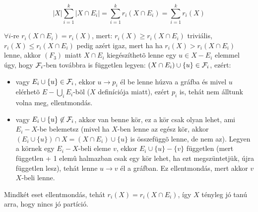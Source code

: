 \[
|X| \sum_{i=1}^k |X \cap E_i| = \sum_{i=1}^k r_i(X \cap E_i) = \sum_{i=1}^k r_i(X)
\]

$\forall i$-re $r_i(X \cap E_i) = r_i(X)$, mert: $r_i(X) \geq r_i(X \cap E_i)$
triviális, $r_i(X) \leq r_i(X \cap E_i)$ pedig azért igaz, mert ha ha $r_i(X)
> r_i(X \cap E_i)$ lenne, akkor $(F_3)$ miatt $X \cap E_i$ kiegészíthetõ
lenne egy $u \in X - E_i$ elemmel úgy, hogy $\mathcal{F}_i$-ben továbbra is független
legyen: $(X \cap E_i) \cup \{u\} \in \mathcal{F}_i$, ezért:

\begin{itemize}
  \item vagy $E_i \cup \{u\} \in \mathcal{F}_i$, ekkor $u \rightarrow p_i$ él be lenne
  húzva a gráfba és mivel $u$ elérhetõ $E - \bigcup_i E_i$-bõl ($X$ definíciója
  miatt), ezért $p_i$ is, tehát nem álltunk volna meg, ellentmondás.
  \item vagy $E_i \cup \{u\} \not\in \mathcal{F}_i$, akkor van benne kör, ez a kör csak
  olyan lehet, ami $E_i-X$-be belemetsz (mivel ha $X$-ben lenne az egész kör,
  akkor $(E_i \cup \{u\})\cap X = (X \cap E_i) \cup \{u\}$ is összefüggõ lenne,
  de nem az). Legyen a körnek egy $E_i-X$-beli eleme $v$, ekkor $E_i \cup \{u\}
  - \{v\}$ független (mert független + 1 elemû halmazban csak egy kör lehet, ha
  ezt megszüntetjük, újra független lesz), tehát lenne $u \rightarrow v$ él a
  gráfban. Ez ellentmondás, mert akkor $v$ $X$-beli lenne.
\end{itemize}

Mindkét eset ellentmondás, tehát $r_i(X) = r_i(X \cap E_i)$, így $X$ tényleg jó
tanú arra, hogy nincs jó partíció.

\begin{figure}[hbt]
\centering
\caption{}
\label{fig:futas2}
\end{figure}